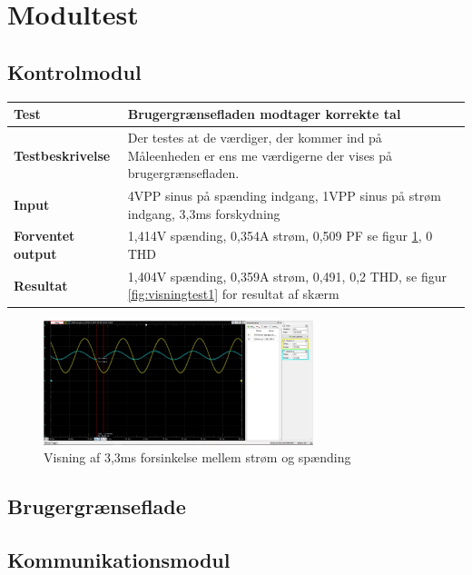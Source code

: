 
\section{Modultest}

\subsection{Kontrolmodul}

\begin{center}
	\begin{tabular}{ | m{} | m{}|} 
		\hline
		\textbf{Test}					&Brugergrænsefladen modtager korrekte tal \\ \hline
		\textbf{Testbeskrivelse}		&Der testes at de værdiger, der kommer ind på Måleenheden er ens me værdigerne der vises på brugergrænsefladen. \\ \hline
		\textbf{Input}					&4VPP sinus på spænding indgang, 1VPP sinus på strøm indgang, 3,3ms forskydning \\ \hline
		\textbf{Forventet output}		&1,414V spænding, 0,354A strøm, 0,509 PF se figur \ref{fig:PFtest1}, 0 THD \\ \hline
		\textbf{Resultat}				&1,404V spænding, 0,359A strøm, 0,491, 0,2 THD,  se figur \ref*{fig:visningtest1} for resultat af skærm  \\ \hline
	\end{tabular}
\end{center}

\begin{figure}[H] %
	\centering
	\includegraphics[width=0.7\textwidth]{Test/PFTest1}
	\caption{Visning af 3,3ms forsinkelse mellem strøm og spænding}
	\label{fig:PFtest1}
\end{figure}

\subsection{Brugergrænseflade}


\subsection{Kommunikationsmodul}